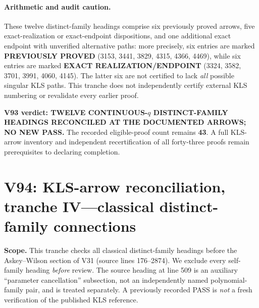 \documentclass[11pt]{article}
\begin{document}
\paragraph{Arithmetic and audit caution.}
These twelve distinct-family headings comprise six previously proved arrows, five exact-realization or exact-endpoint dispositions, and one additional exact endpoint with unverified alternative paths: more precisely, six entries are marked \textbf{PREVIOUSLY PROVED} (3153, 3441, 3829, 4315, 4366, 4469), while six entries are marked \textbf{EXACT REALIZATION/ENDPOINT} (3324, 3582, 3701, 3991, 4060, 4145). The latter six are not certified to lack \emph{all} possible singular KLS paths. This tranche does not independently certify external KLS numbering or revalidate every earlier proof.

\noindent\textbf{V93 verdict: TWELVE CONTINUOUS-$q$ DISTINCT-FAMILY HEADINGS RECONCILED AT THE DOCUMENTED ARROWS; NO NEW PASS.} The recorded eligible-proof count remains \textbf{43}. A full KLS-arrow inventory and independent recertification of all forty-three proofs remain prerequisites to declaring completion.


\section{V94: KLS-arrow reconciliation, tranche IV---classical distinct-family connections}
\noindent\textbf{Scope.} This tranche checks all classical distinct-family headings before the Askey--Wilson section of V31 (source lines 176--2874). We exclude every self-family heading \emph{before} review. The source heading at line 509 is an auxiliary ``parameter cancellation'' subsection, not an independently named polynomial-family pair, and is treated separately. A previously recorded PASS is \emph{not} a fresh verification of the published KLS reference.
\end{document}
